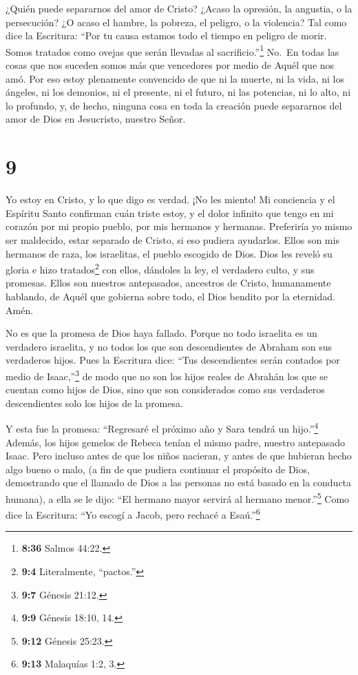  ¿Quién puede separarnos del amor de Cristo? ¿Acaso la
opresión, la angustia, o la persecución? ¿O acaso el hambre, la pobreza,
el peligro, o la violencia?  Tal como dice la Escritura:
``Por tu causa estamos todo el tiempo en peligro de morir. Somos
tratados como ovejas que serán llevadas al sacrificio.''\footnote{\textbf{8:36}
  Salmos 44:22.}  No.~En todas las cosas que nos suceden
somos más que vencedores por medio de Aquél que nos amó. 
Por eso estoy plenamente convencido de que ni la muerte, ni la vida, ni
los ángeles, ni los demonios, ni el presente, ni el futuro, ni las
potencias,  ni lo alto, ni lo profundo, y, de hecho,
ninguna cosa en toda la creación puede separarnos del amor de Dios en
Jesucristo, nuestro Señor.

\hypertarget{section-8}{%
\section{9}\label{section-8}}

 Yo estoy en Cristo, y lo que digo es verdad. ¡No les
miento! Mi conciencia y el Espíritu Santo confirman  cuán
triste estoy, y el dolor infinito que tengo en mi corazón 
por mi propio pueblo, por mis hermanos y hermanas. Preferiría yo mismo
ser maldecido, estar separado de Cristo, si eso pudiera ayudarlos.
 Ellos son mis hermanos de raza, los israelitas, el pueblo
escogido de Dios. Dios les reveló su gloria e hizo tratados\footnote{\textbf{9:4}
  Literalmente, ``pactos.''} con ellos, dándoles la ley, el verdadero
culto, y sus promesas.  Ellos son nuestros antepasados,
ancestros de Cristo, humanamente hablando, de Aquél que gobierna sobre
todo, el Dios bendito por la eternidad. Amén.

 No es que la promesa de Dios haya fallado. Porque no todo
israelita es un verdadero israelita,  y no todos los que son
descendientes de Abraham son sus verdaderos hijos. Pues la Escritura
dice: ``Tus descendientes serán contados por medio de
Isaac,''\footnote{\textbf{9:7} Génesis 21:12.}  de modo que
no son los hijos reales de Abrahán los que se cuentan como hijos de
Dios, sino que son considerados como sus verdaderos descendientes solo
los hijos de la promesa.

 Y esta fue la promesa: ``Regresaré el próximo año y Sara
tendrá un hijo.''\footnote{\textbf{9:9} Génesis 18:10, 14.}
 Además, los hijos gemelos de Rebeca tenían el mismo padre,
nuestro antepasado Isaac.  Pero incluso antes de que los
niños nacieran, y antes de que hubieran hecho algo bueno o malo, (a fin
de que pudiera continuar el propósito de Dios, demostrando que el
llamado de Dios a las personas no está basado en la conducta humana),
 a ella se le dijo: ``El hermano mayor servirá al hermano
menor.''\footnote{\textbf{9:12} Génesis 25:23.}  Como dice
la Escritura: ``Yo escogí a Jacob, pero rechacé a Esaú.''\footnote{\textbf{9:13}
  Malaquías 1:2, 3.}

